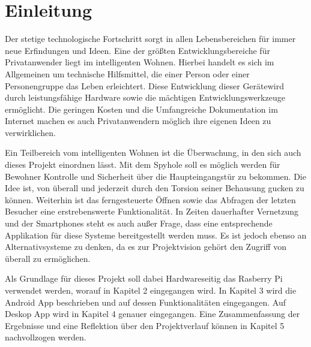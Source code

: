 
\chapter{Einleitung}
Der stetige technologische Fortschritt sorgt in allen Lebensbereichen für immer neue Erfindungen und Ideen. Eine der größten Entwicklungsbereiche für Privatanwender liegt im intelligenten Wohnen. Hierbei handelt es sich im Allgemeinen um technische Hilfsmittel, die einer Person oder einer Personengruppe das Leben erleichtert. Diese Entwicklung dieser Gerätewird durch leistungsfähige Hardware sowie die mächtigen Entwicklungswerkzeuge ermöglicht. Die geringen Kosten und die Umfangreiche Dokumentation im Internet machen es auch Privatanwendern möglich ihre eigenen Ideen zu verwirklichen.  
\par
Ein Teilbereich vom intelligenten Wohnen ist die Überwachung, in den sich auch dieses Projekt einordnen lässt. Mit dem Spyhole soll es möglich werden für Bewohner Kontrolle und Sicherheit über die Haupteingangstür zu bekommen. Die Idee ist, von überall und jederzeit durch den Torsion seiner Behausung gucken zu können. Weiterhin ist das ferngesteuerte Öffnen sowie das Abfragen der letzten Besucher eine erstrebenswerte Funktionalität. In Zeiten dauerhafter Vernetzung und der Smartphones steht es auch außer Frage, dass eine entsprechende Applikation für diese Systeme bereitgestellt werden muss. Es ist jedoch ebenso an Alternativsysteme zu denken, da es zur Projektvision gehört den Zugriff von überall zu ermöglichen. 
\par
Als Grundlage für dieses Projekt soll dabei Hardwareseitig das Rasberry Pi verwendet werden, worauf in Kapitel 2 eingegangen wird. In Kapitel 3 wird die Android App beschrieben und auf dessen Funktionalitäten eingegangen. Auf Deskop App wird in Kapitel 4 genauer eingegangen. Eine Zusammenfassung der Ergebnisse und eine Reflektion über den Projektverlauf können in Kapitel 5 nachvollzogen werden. 
